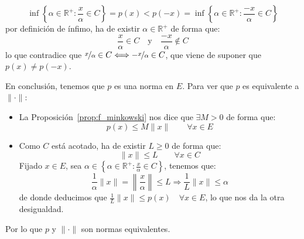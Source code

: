 \begin{ejercicio}
\begin{enumerate}[label=\alph*)]
\begin{itemize}
\begin{itemize}
                            \begin{equation*}
                                \inf\left\{\alpha\in \mathbb{R}^+ : \frac{x}{\alpha}\in C\right\} = p(x) < p(-x) = \inf\left\{\alpha\in \mathbb{R}^+ : \frac{-x}{\alpha}\in C\right\}
                            \end{equation*}
                            por definición de ínfimo, ha de existir $\alpha\in \mathbb{R}^+$ de forma que:
                            \begin{equation*}
                                \frac{x}{\alpha} \in C \quad \text{y}\quad \frac{-x}{\alpha}\notin C
                            \end{equation*}
                            lo que contradice que $\nicefrac{x}{\alpha}\in C\Longleftrightarrow -\nicefrac{x}{\alpha}\in C$, que viene de suponer que $p(x) \neq p(-x)$.
                    \end{itemize}
                    En conclusión, tenemos que $p$ es una norma en $E$. Para ver que $p$ es equivalente a $\|\cdot \|$:
                    \begin{itemize}
                        \item La Proposición~\ref{prop:f_minkowski} nos dice que $\exists M>0$ de forma que:
                            \begin{equation*}
                                p(x) \leq M\|x\| \qquad \forall x\in E
                            \end{equation*}
                        \item Como $C$ está acotado, ha de existir $L\geq 0$ de forma que:
                            \begin{equation*}
                                \|x\| \leq L \qquad \forall x\in C
                            \end{equation*}
                            Fijado $x\in E$, sea $\alpha \in \left\{\alpha\in \mathbb{R}^+ : \frac{x}{\alpha}\in C\right\}$, tenemos que:
                            \begin{equation*}
                                \frac{1}{\alpha}\|x\| = \left\|\frac{x}{\alpha}\right\| \leq L \Longrightarrow \frac{1}{L}\|x\| \leq \alpha
                            \end{equation*}
                            de donde deducimos que $\frac{1}{L}\|x\| \leq p(x) \quad \forall x\in E$, lo que nos da la otra desigualdad.
                    \end{itemize}
                    Por lo que $p$ y $\|\cdot \|$ son normas equivalentes.

\end{itemize}
\end{enumerate}
\end{ejercicio}
